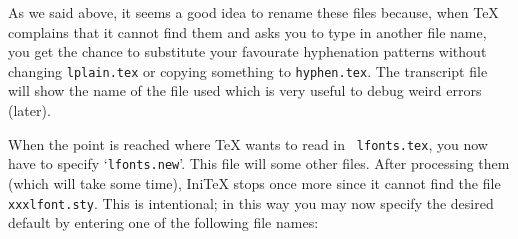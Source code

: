  As we said above,
 it seems a good idea to rename these files because, when \TeX{}
 complains that it cannot find them and asks you to type in another
 file name, you get the chance to substitute
 your favourate hyphenation patterns without changing {\tt lplain.tex}
 or copying something to {\tt hyphen.tex}.
 The transcript file
 will show the name of the file used which is very useful to debug
 weird errors (later).
 
 When the point is reached where \TeX{} wants to read in {\tt
 lfonts.tex}, you now have to specify `{\tt lfonts.new}'. This file
 will \verb++ some other files.  After processing them
 (which will take some time), Ini\TeX{} stops once more since it cannot
 find the file {\tt xxxlfont.sty}.  This is intentional; %
 in this way
 you may now specify the desired default by entering one of the following
 file names:
